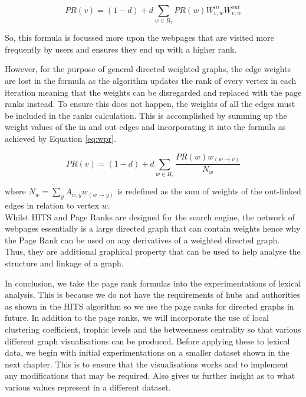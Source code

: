 \begin{equation}\label{eq:proverall}
PR(v) = (1 - d) + d\sum_{w \in B_v}PR(w)W^{in}_{v,w}W^{out}_{v,w}
\end{equation}

So, this formula is focussed more upon the webpages that are visited more frequently by users and ensures they end up with a higher rank. 

However, for the purpose of general directed weighted graphs, the edge weights are lost in the formula as the algorithm updates the rank of every vertex in each iteration meaning that the weights can be disregarded and replaced with the page ranks instead. To ensure this does not happen, the weights of all the edges must be included in the ranks calculation. This is accomplished by summing up the weight values of the in and out edges and incorporating it into the formula as achieved by Equation \ref{eq:wpr}.

\begin{equation} \label{eq:wpr}
PR(v) = (1-d) + d\sum_{w \in B_v}\frac{PR(w)w_{(w \rightarrow v)}}{N_w}
\end{equation}

where $N_w = \sum_y{A_{w,y}w_{(w \rightarrow y)}}$ is redefined as the sum of weights of the out-linked edges in relation to vertex $w$.
\\

Whilst HITS and Page Ranks are designed for the search engine, the network of webpages essentially is a large directed graph that can contain weights hence why the Page Rank can be used on any derivatives of a weighted directed graph. Thus, they are additional graphical property that can be used to help analyse the structure and linkage of a graph. 

In conclusion, we take the page rank formulas into the experimentations of lexical analysis. This is because we do not have the requirements of hubs and authorities as shown in the HITS algorithm so we use the page ranks for directed graphs in future. In addition to the page ranks, we will incorporate the use of local clustering coefficient, trophic levels and the betweenness centrality so that various different graph visualisations can be produced. Before applying these to lexical data, we begin with initial experimentations on a smaller dataset shown in the next chapter. This is to ensure that the visualisations works and to implement any modifications that may be required. Also gives us further insight as to what various values represent in a different dataset.
